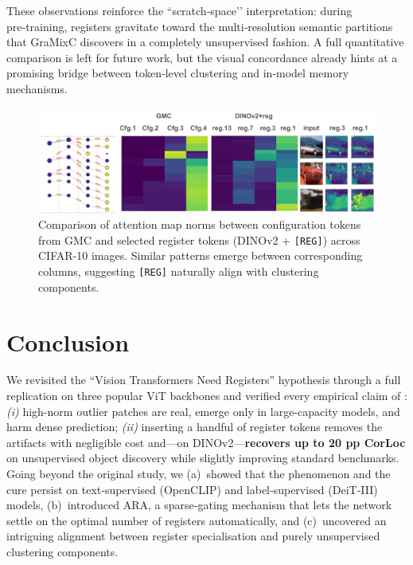 \documentclass{article}
\newcommand{\RegTok}{\texttt{[REG]}\xspace}
\newcommand{\citet}{\textcite}
\newcommand{\OURS}{\textsc{ARA}\xspace}
\begin{document}
These observations reinforce the ``scratch‑space’’ interpretation: during pre‑training, registers gravitate toward the multi‑resolution semantic partitions that GraMixC discovers in a completely unsupervised fashion.
A full quantitative comparison is left for future work, but the visual concordance already hints at a promising bridge between token‑level clustering and in‑model memory mechanisms.

\begin{figure}[t]
  \centering
  \includegraphics[width=\textwidth]{figures/cifar10_attnmap.png}
  \caption{
    Comparison of attention map norms between configuration tokens from GMC and selected register tokens (DINOv2 + \RegTok) across CIFAR-10 images.
    Similar patterns emerge between corresponding columns, suggesting \RegTok naturally align with clustering components.
  }
  \vspace{-1em}
  \label{fig:cifar10_attnmap}
\end{figure}



\section{Conclusion}
\label{sec:concl}
We revisited the ``Vision Transformers Need Registers'' hypothesis through a full replication on three popular ViT backbones and verified every empirical claim of \citet{darcetVisionTransformersNeed2024}: 
\emph{(i)} high-norm outlier patches are real, emerge only in large-capacity models, and harm dense prediction; 
\emph{(ii)} inserting a handful of register tokens removes the artifacts with negligible cost and—on DINOv2—\textbf{recovers up to 20 pp CorLoc} on unsupervised object discovery while slightly improving standard benchmarks. 
Going beyond the original study, we 
(a) showed that the phenomenon and the cure persist on text‑supervised (OpenCLIP) and label‑supervised (DeiT‑III) models, 
(b) introduced \OURS, a sparse‑gating mechanism that lets the network settle on the optimal number of registers automatically, and
(c) uncovered an intriguing alignment between register specialisation and purely unsupervised clustering components.
\end{document}
